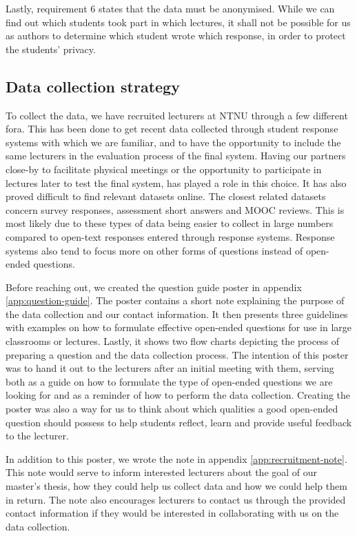 Lastly, requirement 6 states that the data must be anonymised. While we can find out which students took part in which lectures, it shall not be possible for us as authors to determine which student wrote which response, in order to protect the students' privacy.


\subsection{Data collection strategy}\label{sec:data-collection-strategy}
To collect the data, we have recruited lecturers at NTNU through a few different fora. This has been done to get recent data collected through student response systems with which we are familiar, and to have the opportunity to include the same lecturers in the evaluation process of the final system. Having our partners close-by to facilitate physical meetings or the opportunity to participate in lectures later to test the final system, has played a role in this choice. It has also proved difficult to find relevant datasets online. The closest related datasets concern survey responses, assessment short answers and MOOC reviews. This is most likely due to these types of data being easier to collect in large numbers compared to open-text responses entered through response systems. Response systems also tend to focus more on other forms of questions instead of open-ended questions.

Before reaching out, we created the question guide poster in appendix \ref{app:question-guide}. The poster contains a short note explaining the purpose of the data collection and our contact information. It then presents three guidelines with examples on how to formulate effective open-ended questions for use in large classrooms or lectures. Lastly, it shows two flow charts depicting the process of preparing a question and the data collection process. The intention of this poster was to hand it out to the lecturers after an initial meeting with them, serving both as a guide on how to formulate the type of open-ended questions we are looking for and as a reminder of how to perform the data collection. Creating the poster was also a way for us to think about which qualities a good open-ended question should possess to help students reflect, learn and provide useful feedback to the lecturer.

In addition to this poster, we wrote the note in appendix \ref{app:recruitment-note}. This note would serve to inform interested lecturers about the goal of our master's thesis, how they could help us collect data and how we could help them in return. The note also encourages lecturers to contact us through the provided contact information if they would be interested in collaborating with us on the data collection.

